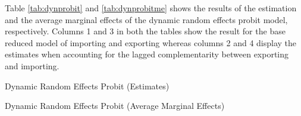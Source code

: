 \documentclass[12pt]{article}
\begin{document}
Table \ref{tab:dynprobit} and \ref{tab:dynprobitme} shows the results of the 
estimation and the average marginal effects of the dynamic random
effects probit model, respectively. Columns 1 and 3 in both the tables show the result for the base
reduced model of importing and exporting  whereas columns 2 and 4
display the estimates when accounting for the lagged complementarity
between exporting and importing. 


\begin{center}
\begin{table}[H]
\caption{Dynamic Random Effects Probit (Estimates)}
\label{tab:dynprobit}

\end{table}
\end{center}
\restoregeometry
\begin{center}
\begin{table}[H]
\caption{Dynamic Random Effects Probit (Average Marginal Effects)}
\label{tab:dynprobitme}

\end{table}
\end{center}

 
\end{document}

